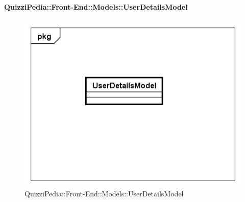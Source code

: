 		\paragraph{QuizziPedia::Front-End::Models::UserDetailsModel}
		
		\label{QuizziPedia::Front-End::Models:.UserDetailsModel}
		
		\begin{figure}[ht]
			\centering
			\includegraphics[scale=0.5,keepaspectratio]{UML/Classi/Front-End/QuizziPedia_Front-end_Models_UserDetailsModel.png}
			\caption{QuizziPedia::Front-End::Models::UserDetailsModel}
		\end{figure} \FloatBarrier
		
